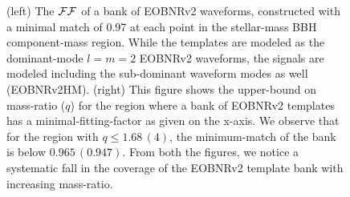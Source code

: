 \begin{figure}
\caption{\label{fig:match_eob22eobhm_m1m2} (left) The $\mathcal{FF}$ of a
bank of EOBNRv2 waveforms, constructed with a minimal match of 0.97 at each
point in the stellar-mass BBH component-mass region. While the templates are
modeled as the dominant-mode $l=m=2$ EOBNRv2 waveforms, the signals are modeled 
including the sub-dominant waveform modes as well (EOBNRv2HM). (right) This figure shows the 
upper-bound on mass-ratio ($q$) for the region where a bank of EOBNRv2
templates has a minimal-fitting-factor as given on the x-axis. We observe that for
the region with $q \leq 1.68\,(4)$, the minimum-match of the bank is below $0.965\,(0.947)$. 
From both the figures, we notice a systematic fall in the coverage of the EOBNRv2 
template bank with increasing mass-ratio.} 
\end{figure}
